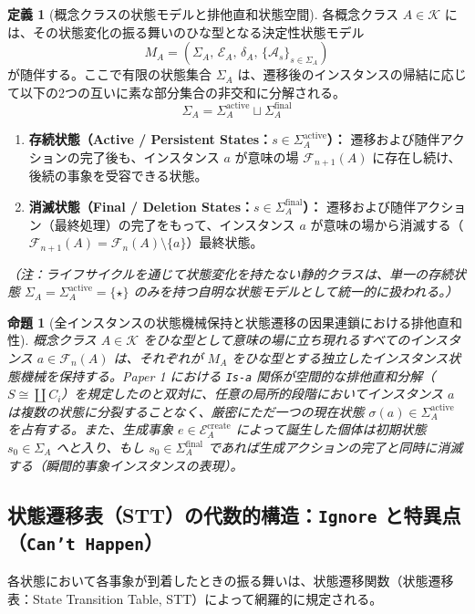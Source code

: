 \documentclass[11pt,a4paper]{ltjsarticle}
\theoremstyle{definition}
\newtheorem{definition}{定義}[section]
\theoremstyle{plain}
\newtheorem{proposition}{命題}[section]
\theoremstyle{remark}
\begin{document}
\begin{definition}[概念クラスの状態モデルと排他直和状態空間]\label{def:state-model}
各概念クラス $A \in \mathcal{K}$ には、その状態変化の振る舞いのひな型となる決定性状態モデル
\begin{equation}
M_A = \left(\Sigma_A,\, \mathcal{E}_A,\, \delta_A,\, \{\mathcal{A}_s\}_{s \in \Sigma_A}\right)
\end{equation}
が随伴する。ここで有限の状態集合 $\Sigma_A$ は、遷移後のインスタンスの帰結に応じて以下の2つの互いに素な部分集合の非交和に分解される。
\begin{equation}
\Sigma_A = \Sigma_A^{\mathrm{active}} \sqcup \Sigma_A^{\mathrm{final}}
\end{equation}
\begin{enumerate}
    \item \textbf{存続状態（Active / Persistent States：$s \in \Sigma_A^{\mathrm{active}}$）：} 遷移および随伴アクションの完了後も、インスタンス $a$ が意味の場 $\mathcal{F}_{n+1}(A)$ に存在し続け、後続の事象を受容できる状態。
    \item \textbf{消滅状態（Final / Deletion States：$s \in \Sigma_A^{\mathrm{final}}$）：} 遷移および随伴アクション（最終処理）の完了をもって、インスタンス $a$ が意味の場から消滅する（$\mathcal{F}_{n+1}(A) = \mathcal{F}_n(A) \setminus \{a\}$）最終状態。
\end{enumerate}
\emph{（注：ライフサイクルを通じて状態変化を持たない静的クラスは、単一の存続状態 $\Sigma_A = \Sigma_A^{\mathrm{active}} = \{\star\}$ のみを持つ自明な状態モデルとして統一的に扱われる。）}
\end{definition}

\begin{proposition}[全インスタンスの状態機械保持と状態遷移の因果連鎖における排他直和性]\label{prop:instance-fsm}
概念クラス $A \in \mathcal{K}$ をひな型として意味の場に立ち現れるすべてのインスタンス $a \in \mathcal{F}_n(A)$ は、それぞれが $M_A$ をひな型とする独立したインスタンス状態機械を保持する。Paper 1 における \texttt{Is-a} 関係が空間的な排他直和分解（$S \cong \coprod C_i$）を規定したのと双対に、任意の局所的段階においてインスタンス $a$ は複数の状態に分裂することなく、厳密にただ一つの現在状態 $\sigma(a) \in \Sigma_A^{\mathrm{active}}$ を占有する。また、生成事象 $e \in \mathcal{E}_A^{\mathrm{create}}$ によって誕生した個体は初期状態 $s_0 \in \Sigma_A$ へと入り、もし $s_0 \in \Sigma_A^{\mathrm{final}}$ であれば生成アクションの完了と同時に消滅する（瞬間的事象インスタンスの表現）。
\end{proposition}
\subsection{状態遷移表（STT）の代数的構造：\texttt{Ignore} と特異点（\texttt{Can't Happen}）}
各状態において各事象が到着したときの振る舞いは、状態遷移関数（状態遷移表：State Transition Table, STT）によって網羅的に規定される。
\end{document}
